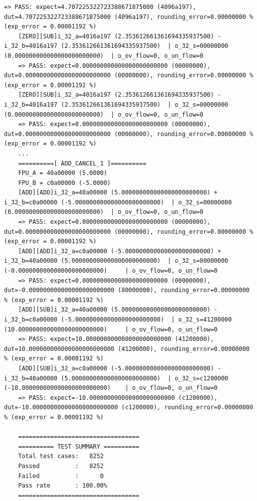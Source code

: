 \begin{lstlisting}[style=StyleResult, basicstyle=\fontsize{6}{7}\selectfont\ttfamily ,language=Result, caption={Kết quả test của bộ cộng trừ FPU.}]
	=> PASS: expect=4.707225322723388671875000 (4096a197), dut=4.707225322723388671875000 (4096a197), rounding_error=0.00000000 % (exp_error = 0.00001192 %)
	[ZERO][SUB]i_32_a=4016a197 (2.353612661361694335937500) - i_32_b=4016a197 (2.353612661361694335937500) 	| o_32_s=00000000 (0.000000000000000000000000) 	| o_ov_flow=0, o_un_flow=0
	=> PASS: expect=0.000000000000000000000000 (00000000), dut=0.000000000000000000000000 (00000000), rounding_error=0.00000000 % (exp_error = 0.00001192 %)
	[ZERO][SUB]i_32_a=4016a197 (2.353612661361694335937500) - i_32_b=4016a197 (2.353612661361694335937500) 	| o_32_s=00000000 (0.000000000000000000000000) 	| o_ov_flow=0, o_un_flow=0
	=> PASS: expect=0.000000000000000000000000 (00000000), dut=0.000000000000000000000000 (00000000), rounding_error=0.00000000 % (exp_error = 0.00001192 %)
	...
	==========[ ADD_CANCEL_1 ]==========
	FPU_A = 40a00000 (5.0000)
	FPU_B = c0a00000 (-5.0000)
	[ADD][ADD]i_32_a=40a00000 (5.000000000000000000000000) + i_32_b=c0a00000 (-5.000000000000000000000000) 	| o_32_s=00000000 (0.000000000000000000000000) 	| o_ov_flow=0, o_un_flow=0
	=> PASS: expect=0.000000000000000000000000 (00000000), dut=0.000000000000000000000000 (00000000), rounding_error=0.00000000 % (exp_error = 0.00001192 %)
	[ADD][ADD]i_32_a=c0a00000 (-5.000000000000000000000000) + i_32_b=40a00000 (5.000000000000000000000000) 	| o_32_s=80000000 (-0.000000000000000000000000) 	| o_ov_flow=0, o_un_flow=0
	=> PASS: expect=0.000000000000000000000000 (00000000), dut=-0.000000000000000000000000 (80000000), rounding_error=0.00000000 % (exp_error = 0.00001192 %)
	[ADD][SUB]i_32_a=40a00000 (5.000000000000000000000000) - i_32_b=c0a00000 (-5.000000000000000000000000) 	| o_32_s=41200000 (10.000000000000000000000000) 	| o_ov_flow=0, o_un_flow=0
	=> PASS: expect=10.000000000000000000000000 (41200000), dut=10.000000000000000000000000 (41200000), rounding_error=0.00000000 % (exp_error = 0.00001192 %)
	[ADD][SUB]i_32_a=c0a00000 (-5.000000000000000000000000) - i_32_b=40a00000 (5.000000000000000000000000) 	| o_32_s=c1200000 (-10.000000000000000000000000) 	| o_ov_flow=0, o_un_flow=0
	=> PASS: expect=-10.000000000000000000000000 (c1200000), dut=-10.000000000000000000000000 (c1200000), rounding_error=0.00000000 % (exp_error = 0.00001192 %)
	
	==================================
	========== TEST SUMMARY ==========
	Total test cases:   8252
	Passed          :   8252
	Failed          :      0
	Pass rate       : 100.00%
	==================================
\end{lstlisting}

